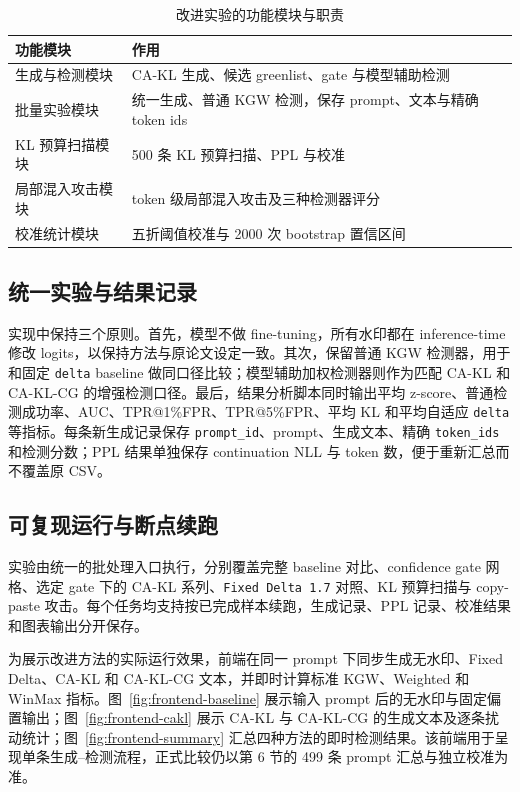 \documentclass[a4paper,UTF8,zihao=5]{ctexart}
\newcommand{\method}{CA-KL}
\newcommand{\fullmethod}{CA-KL-CG}
\begin{document}
\begin{table}[H]
    \centering
    \caption{改进实验的功能模块与职责}
    \label{tab:code-structure}
    \small
    \begin{tabularx}{\textwidth}{p{}X}
        \toprule
        功能模块 & 作用 \\
        \midrule
        生成与检测模块 & CA-KL 生成、候选 greenlist、gate 与模型辅助检测 \\
        批量实验模块 & 统一生成、普通 KGW 检测，保存 prompt、文本与精确 token ids \\
        KL 预算扫描模块 & 500 条 KL 预算扫描、PPL 与校准 \\
        局部混入攻击模块 & token 级局部混入攻击及三种检测器评分 \\
        校准统计模块 & 五折阈值校准与 2000 次 bootstrap 置信区间 \\
        \bottomrule
    \end{tabularx}
\end{table}

\subsection{统一实验与结果记录}

实现中保持三个原则。首先，模型不做 fine-tuning，所有水印都在 inference-time 修改 logits，以保持方法与原论文设定一致。其次，保留普通 KGW 检测器，用于和固定 \texttt{delta} baseline 做同口径比较；模型辅助加权检测器则作为匹配 \method{} 和 \fullmethod{} 的增强检测口径。最后，结果分析脚本同时输出平均 z-score、普通检测成功率、AUC、TPR@1\%FPR、TPR@5\%FPR、平均 KL 和平均自适应 \texttt{delta} 等指标。每条新生成记录保存 \texttt{prompt\_id}、prompt、生成文本、精确 \texttt{token\_ids} 和检测分数；PPL 结果单独保存 continuation NLL 与 token 数，便于重新汇总而不覆盖原 CSV。

\subsection{可复现运行与断点续跑}

实验由统一的批处理入口执行，分别覆盖完整 baseline 对比、confidence gate 网格、选定 gate 下的 \method{} 系列、\texttt{Fixed Delta 1.7} 对照、KL 预算扫描与 copy-paste 攻击。每个任务均支持按已完成样本续跑，生成记录、PPL 记录、校准结果和图表输出分开保存。

为展示改进方法的实际运行效果，前端在同一 prompt 下同步生成无水印、Fixed Delta、\method{} 和 \fullmethod{} 文本，并即时计算标准 KGW、Weighted 和 WinMax 指标。图~\ref{fig:frontend-baseline} 展示输入 prompt 后的无水印与固定偏置输出；图~\ref{fig:frontend-cakl} 展示 \method{} 与 \fullmethod{} 的生成文本及逐条扰动统计；图~\ref{fig:frontend-summary} 汇总四种方法的即时检测结果。该前端用于呈现单条生成--检测流程，正式比较仍以第 6 节的 499 条 prompt 汇总与独立校准为准。
\end{document}
